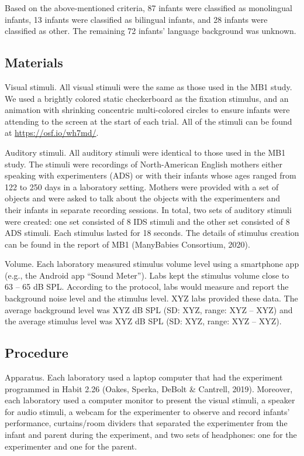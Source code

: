 \documentclass[
  ,man,floatsintext]{apa6}
\begin{document}
Based on the above-mentioned criteria, 87 infants were classified as monolingual infants, 13 infants were classified as bilingual infants, and 28 infants were classified as other. The remaining 72 infants' language background was unknown.

\hypertarget{materials}{%
\subsection{Materials}\label{materials}}

Visual stimuli. All visual stimuli were the same as those used in the MB1 study. We used a brightly colored static checkerboard as the fixation stimulus, and an animation with shrinking concentric multi-colored circles to ensure infants were attending to the screen at the start of each trial. All of the stimuli can be found at \url{https://osf.io/wh7md/}.

Auditory stimuli. All auditory stimuli were identical to those used in the MB1 study. The stimuli were recordings of North-American English mothers either speaking with experimenters (ADS) or with their infants whose ages ranged from 122 to 250 days in a laboratory setting. Mothers were provided with a set of objects and were asked to talk about the objects with the experimenters and their infants in separate recording sessions. In total, two sets of auditory stimuli were created: one set consisted of 8 IDS stimuli and the other set consisted of 8 ADS stimuli. Each stimulus lasted for 18 seconds. The details of stimulus creation can be found in the report of MB1 (ManyBabies Consortium, 2020).

Volume. Each laboratory measured stimulus volume level using a smartphone app (e.g., the Android app ``Sound Meter''). Labs kept the stimulus volume close to 63 -- 65 dB SPL. According to the protocol, labs would measure and report the background noise level and the stimulus level. XYZ labs provided these data. The average background level was XYZ dB SPL (SD: XYZ, range: XYZ -- XYZ) and the average stimulus level was XYZ dB SPL (SD: XYZ, range: XYZ -- XYZ).

\hypertarget{procedure}{%
\subsection{Procedure}\label{procedure}}

Apparatus. Each laboratory used a laptop computer that had the experiment programmed in Habit 2.26 (Oakes, Sperka, DeBolt \& Cantrell, 2019). Moreover, each laboratory used a computer monitor to present the visual stimuli, a speaker for audio stimuli, a webcam for the experimenter to observe and record infants' performance, curtains/room dividers that separated the experimenter from the infant and parent during the experiment, and two sets of headphones: one for the experimenter and one for the parent.
\end{document}
